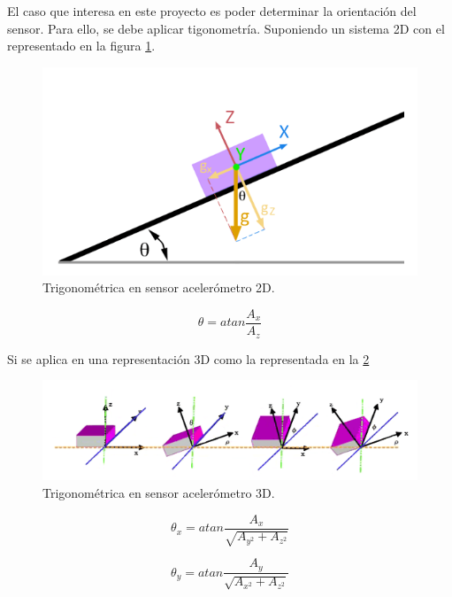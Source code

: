 El caso que interesa en este proyecto es poder determinar la orientación del sensor. Para ello, se debe aplicar tigonometría. Suponiendo un sistema 2D con el representado en la figura \ref{fig:acelerometro1}.

	\begin{figure}[H]
	\center
	\includegraphics[scale=0.4]{imagenes/Balancing_robot/acelerometro1}
	\caption{Trigonométrica en sensor acelerómetro 2D.}
	\label{fig:acelerometro1}
\end{figure}

\begin{equation}
 	\theta = atan\frac{A_{x}}{A_{z}}
\end{equation}

Si se aplica en una representación 3D como la representada en la \ref{fig:acelerometro2}

	\begin{figure}[H]
	\center
	\includegraphics[scale=0.6]{imagenes/Balancing_robot/acelerometro2}
	\caption{Trigonométrica en sensor acelerómetro 3D.}
	\label{fig:acelerometro2}
\end{figure}

\begin{equation}
	\theta_{x} = atan\frac{A_{x}}{\sqrt{A_{y^2}+A_{z^2}}}
\end{equation}

\begin{equation}
\theta_{y} = atan\frac{A_{y}}{\sqrt{A_{x^2}+A_{z^2}}}
\end{equation}

